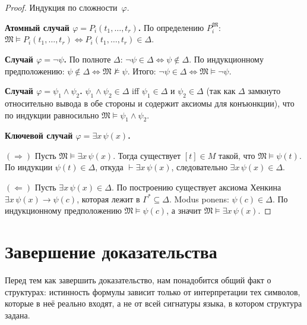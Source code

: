 \documentclass[12pt, a4paper]{article}
\theoremstyle{plain}
\theoremstyle{definition}
\newcommand{\proves}{\vdash}
\renewcommand{\models}{\vDash}
\newcommand{\Struct}{\mathfrak{M}}
\begin{document}
\begin{proof}
Индукция по сложности~$\varphi$.

\medskip
\noindent\textbf{Атомный случай $\varphi = P_i(t_1,\ldots,t_r)$.}
По определению $P_i^{\Struct}$:
$\Struct \models P_i(t_1,\ldots,t_r) \iff P_i(t_1,\ldots,t_r) \in \Delta$.

\medskip
\noindent\textbf{Случай $\varphi = \neg\psi$.}
По полноте $\Delta$: $\neg\psi \in \Delta \iff \psi \notin \Delta$.
По индукционному предположению: $\psi \notin \Delta \iff \Struct \not\models \psi$.
Итого: $\neg\psi \in \Delta \iff \Struct \models \neg\psi$. \checkmark

\medskip
\noindent\textbf{Случай $\varphi = \psi_1 \wedge \psi_2$.}
$\psi_1 \wedge \psi_2 \in \Delta$ iff $\psi_1 \in \Delta$ и $\psi_2 \in \Delta$
(так как $\Delta$ замкнуто относительно вывода в обе стороны
и содержит аксиомы для конъюнкции),
что по индукции равносильно $\Struct \models \psi_1 \wedge \psi_2$. \checkmark

\medskip
\noindent\textbf{Ключевой случай $\varphi = \exists x\,\psi(x)$.}

$(\Rightarrow)$ Пусть $\Struct \models \exists x\,\psi(x)$.
Тогда существует $[t] \in M$ такой, что $\Struct \models \psi(t)$.
По индукции $\psi(t) \in \Delta$, откуда $\proves \exists x\,\psi(x)$,
следовательно $\exists x\,\psi(x) \in \Delta$.

$(\Leftarrow)$ Пусть $\exists x\,\psi(x) \in \Delta$.
По построению существует аксиома Хенкина
$\exists x\,\psi(x) \to \psi(c)$, которая лежит в $\Gamma^* \subseteq \Delta$.
Modus ponens: $\psi(c) \in \Delta$.
По индукционному предположению $\Struct \models \psi(c)$,
а значит $\Struct \models \exists x\,\psi(x)$. \checkmark
\end{proof}

\section{Завершение доказательства}

Перед тем как завершить доказательство, нам понадобится общий факт о
структурах: истинность формулы зависит только от интерпретации тех
символов, которые в неё реально входят, а не от всей сигнатуры языка,
в котором структура задана.
\end{document}
